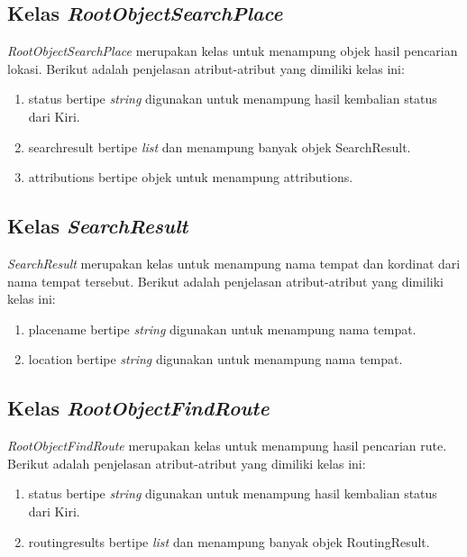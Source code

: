 \subsection{Kelas \textit{RootObjectSearchPlace}}
\label{lab:Kelas RootObjectSearchPlace}
\hspace{0.5cm} \textit{RootObjectSearchPlace} merupakan kelas untuk menampung objek hasil pencarian lokasi. Berikut adalah penjelasan atribut-atribut yang dimiliki kelas ini:
\begin{enumerate}
	\item status bertipe \textit{string} digunakan untuk menampung hasil kembalian status dari Kiri.
	\item searchresult bertipe \textit{list} dan menampung banyak objek SearchResult. 
	\item attributions bertipe objek untuk menampung attributions.
\end{enumerate}


\subsection{Kelas \textit{SearchResult}}
\label{lab:Kelas SearchResult}
\hspace{0.5cm} \textit{SearchResult} merupakan kelas untuk menampung nama tempat dan kordinat dari nama tempat tersebut. Berikut adalah penjelasan atribut-atribut yang dimiliki kelas ini:
\begin{enumerate}
	\item placename bertipe \textit{string} digunakan untuk menampung nama tempat. 
	\item location bertipe \textit{string} digunakan untuk menampung nama tempat.
\end{enumerate}

\subsection{Kelas \textit{RootObjectFindRoute}}
\label{lab:Kelas RootObjectFindRoute}
\hspace{0.5cm} \textit{RootObjectFindRoute} merupakan kelas untuk menampung hasil pencarian rute. Berikut adalah penjelasan atribut-atribut yang dimiliki kelas ini:
\begin{enumerate}
	\item status bertipe \textit{string} digunakan untuk menampung hasil kembalian status dari Kiri.
	\item routingresults bertipe \textit{list} dan menampung banyak objek RoutingResult.
\end{enumerate}

